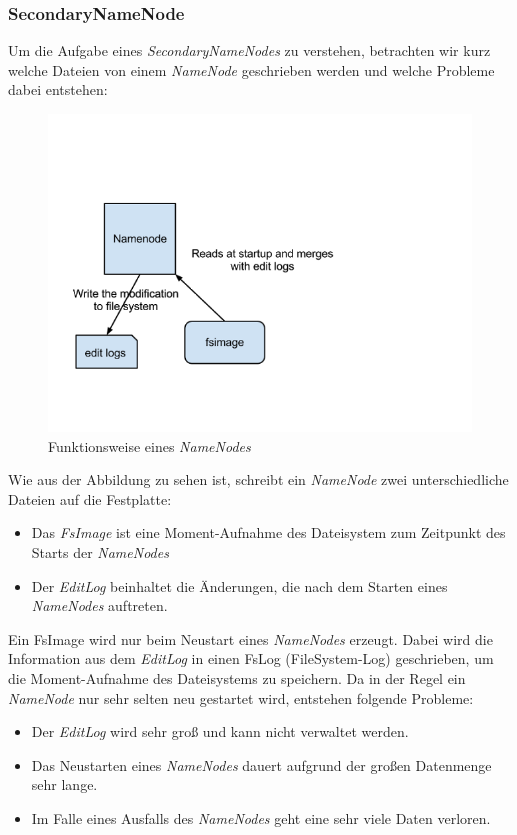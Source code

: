 \subsubsection{SecondaryNameNode}
Um die Aufgabe eines \textit{SecondaryNameNodes} zu verstehen, betrachten wir kurz welche Dateien von einem \textit{NameNode} geschrieben werden und welche Probleme dabei entstehen:
\begin{figure}[H]
	\centering
	\includegraphics[width=1.0\textwidth]{images/06namenode.png}
	\caption{Funktionsweise eines \textit{NameNodes}}
	\label{img:grafik-nameNode}
\end{figure}

Wie aus der Abbildung zu sehen ist, schreibt ein \textit{NameNode} zwei unterschiedliche Dateien auf die Festplatte: \\
\begin{itemize}
\item Das \textit{FsImage} ist eine Moment-Aufnahme des Dateisystem zum Zeitpunkt des Starts der \textit{NameNodes}
\item Der \textit{EditLog} beinhaltet die Änderungen, die nach dem Starten eines \textit{NameNodes} auftreten.
\end{itemize}
Ein FsImage wird nur beim Neustart eines \textit{NameNodes} erzeugt. Dabei wird die Information aus dem \textit{EditLog} in einen FsLog (FileSystem-Log) geschrieben, um die Moment-Aufnahme des Dateisystems zu speichern.
Da in der Regel ein \textit{NameNode} nur sehr selten neu gestartet wird, entstehen folgende Probleme:
\begin{itemize}
\item Der \textit{EditLog} wird sehr groß und kann nicht verwaltet werden.
\item Das Neustarten eines \textit{NameNodes} dauert aufgrund der großen Datenmenge sehr lange.
\item Im Falle eines Ausfalls des \textit{NameNodes} geht eine sehr viele Daten verloren.
\end{itemize}

